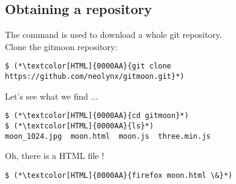 

\subsection{Obtaining a repository}
\begin{frame}[fragile]
  \subslidetitle
  The command  is used to download a whole git repository.
  \\
  \vspace{1em}
  Clone the gitmoon repository:
  \begin{lstlisting}
$ (*\textcolor[HTML]{0000AA}{git clone https://github.com/neolynx/gitmoon.git}*)
  \end{lstlisting}


  Let's see what we find ...
  \begin{lstlisting}
$ (*\textcolor[HTML]{0000AA}{cd gitmoon}*)
$ (*\textcolor[HTML]{0000AA}{ls}*)
moon_1024.jpg  moon.html  moon.js  three.min.js
  \end{lstlisting}

  Oh, there is a HTML file !
  \begin{lstlisting}
$ (*\textcolor[HTML]{0000AA}{firefox moon.html \&}*)
  \end{lstlisting}
\end{frame}

